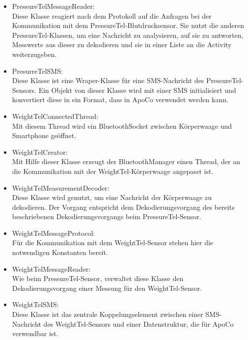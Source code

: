 \begin{itemize}
 \item PressureTelMessageReader:\\
 Diese Klasse reagiert nach dem Protokoll auf die Anfragen bei der Kommunikation mit dem PressureTel-Blutdrucksensor.
 Sie nutzt die anderen PressureTel-Klassen, um eine Nachricht zu analysieren, auf sie zu antworten, 
 Messwerte aus dieser zu dekodieren und sie in einer Liste an die Activity weiterzugeben. 
 
 \item PresurreTelSMS:\\
 Diese Klasse ist eine Wraper-Klasse f\"ur eine SMS-Nachricht des PressureTel-Sensors.
 Ein Objekt von dieser Klasse wird mit einer SMS initialisiert und konvertiert diese in ein Format,
 dass in ApoCo verwendet werden kann.
 
 \item WeightTelConnectedThread:\\
 Mit diesem Thread wird ein BluetoothSocket zwischen K\"orperwaage und Smartphone ge\"offnet.
 
 \item WeightTelCreator:\\
 Mit Hilfe dieser Klasse erzeugt der BluetoothManager einen Thread, 
 der an die Kommunikation mit der WeightTel-K\"orperwaage angepasst ist.
 
 \item WeightTelMeasurementDecoder:\\
 Diese Klasse wird genutzt, um eine Nachricht der K\"orperwaage zu dekodieren.
 Der Vorgang entspricht dem Dekodierungsvorgang des bereits beschriebenen Dekodierungsvorgangs beim PressureTel-Sensor.
 
 \item WeightTelMessageProtocol:\\
 F\"ur die Kommunikation mit dem WeightTel-Sensor stehen hier die notwendigen Konstanten bereit.
 
 \item WeightTelMessageReader:\\
 Wie beim PressureTel-Sensor, verwaltet diese Klasse den Dekodierungsvorgang einer Messung f\"ur den WeightTel-Sensor.
 
 \item WeightTelSMS:\\
 Diese Klasse ist das zentrale Koppelungselement zwischen einer SMS-Nachricht des WeightTel-Sensors und einer Datenstruktur, 
 die f\"ur ApoCo verwendbar ist.
 
\end{itemize}

